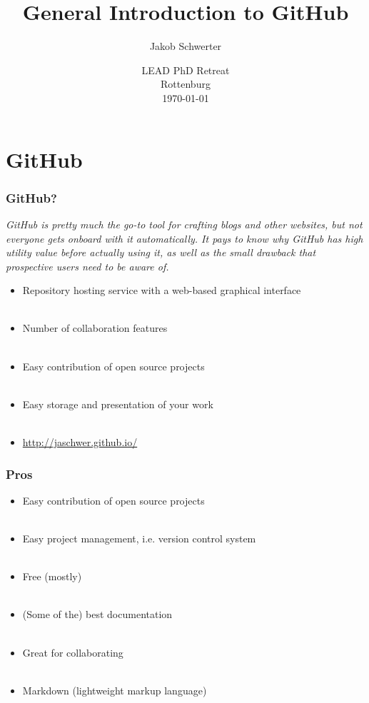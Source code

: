 \documentclass[presentation, 10pt, xcolor=dvipsnames]{beamer}
\title{General Introduction to GitHub}
\author{Jakob Schwerter}
\date{LEAD PhD Retreat\\ Rottenburg \\ \today }
\begin{document}
\begin{frame}
  \titlepage
\end{frame}
%





\section{GitHub}
\begin{frame}[c]
  \frametitle{GitHub?}
\textit{GitHub is pretty much the go-to tool for crafting blogs and other websites, but not everyone gets onboard with it automatically. It pays to know why GitHub has high utility value before actually using it, as well as the small drawback that prospective users need to be aware of.} \\[2ex]
\begin{itemize}
	\item <1-> Repository hosting service with a web-based graphical interface
	\\~\\ \item <2-> Number of collaboration features
	\\~\\ \item <3-> Easy contribution of open source projects
	\\~\\ \item <4-> Easy storage and presentation of your work
	\\~\\ \item <5-> \hyperlink{http://jaschwer.github.io/}{http://jaschwer.github.io/}
	\end{itemize}
\end{frame}


\begin{frame}[c]
  \frametitle{Pros}
\begin{itemize}
	\item <1-> Easy contribution of open source projects
	\\~\\ \item <2-> Easy project management, i.e. version control system
	\\~\\ \item <3-> Free (mostly)
	\\~\\ \item <4-> (Some of the) best documentation
	\\~\\ \item <5-> Great for collaborating
	\\~\\ \item <6-> Markdown (lightweight markup language)
	\end{itemize}
\end{frame}
\end{document}
